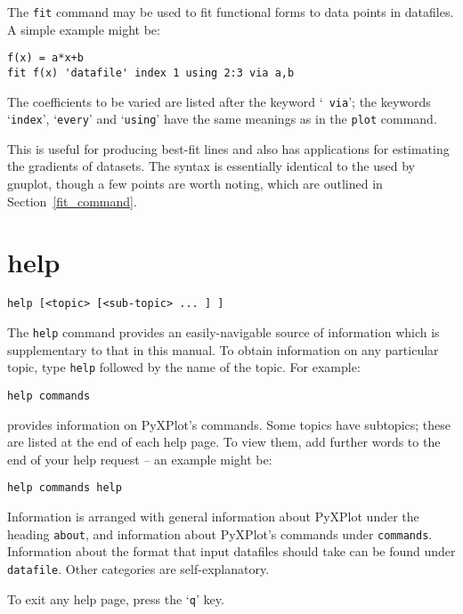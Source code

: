 The {\tt fit} command may be used to fit functional forms to data points in
datafiles. A simple example might be:

\begin{verbatim}
f(x) = a*x+b
fit f(x) 'datafile' index 1 using 2:3 via a,b
\end{verbatim}

\noindent The coefficients to be varied are listed after the keyword `{\tt
via}'; the keywords `{\tt index}', `{\tt every}' and `{\tt using}' have the
same meanings as in the {\tt plot} command.

This is useful for producing best-fit lines and also has applications for
estimating the gradients of datasets.  The syntax is essentially identical to
the used by gnuplot, though a few points are worth noting, which are outlined
in Section~\ref{fit_command}.

\section{help}

\begin{verbatim}
help [<topic> [<sub-topic> ... ] ]
\end{verbatim}

The {\tt help} command provides an easily-navigable source of information which
is supplementary to that in this manual.  To obtain information on any
particular topic, type {\tt help} followed by the name of the topic. For
example:

\begin{verbatim}
help commands
\end{verbatim}

\noindent provides information on PyXPlot's commands. Some topics have subtopics; these
are listed at the end of each help page. To view them, add further words to the
end of your help request -- an example might be:

\begin{verbatim}
help commands help
\end{verbatim}

Information is arranged with general information about PyXPlot under the heading
{\tt about}, and information about PyXPlot's commands under {\tt commands}.
Information about the format that input datafiles should take can be found
under {\tt datafile}.  Other categories are self-explanatory.

To exit any help page, press the `{\tt q}' key.

